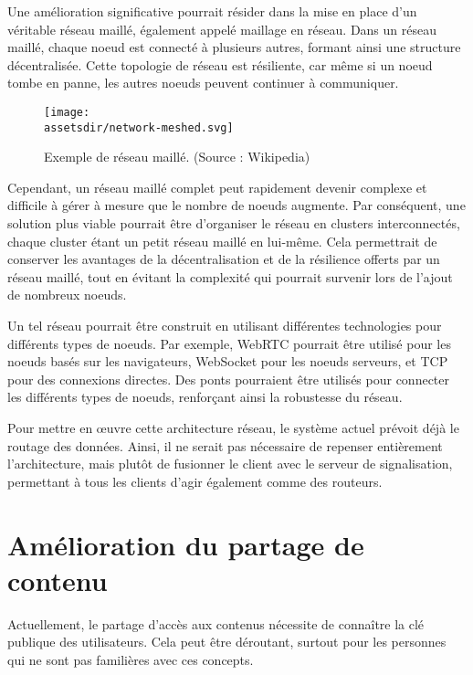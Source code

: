 Une amélioration significative pourrait résider dans la mise en place d'un véritable réseau maillé, également appelé maillage en réseau. Dans un réseau maillé, chaque noeud est connecté à plusieurs autres, formant ainsi une structure décentralisée. Cette topologie de réseau est résiliente, car même si un noeud tombe en panne, les autres noeuds peuvent continuer à communiquer.

\begin{wrapfigure}{l}{0.30\textwidth}
    \centering
    \texttt{[image: \\assetsdir/network-meshed.svg]}
    \caption{Exemple de réseau maillé. (Source : Wikipedia\cite{TopologieMesh2023})}
    \label{fig:network-meshed}
\end{wrapfigure}

Cependant, un réseau maillé complet peut rapidement devenir complexe et difficile à gérer à mesure que le nombre de noeuds augmente. Par conséquent, une solution plus viable pourrait être d'organiser le réseau en clusters interconnectés, chaque cluster étant un petit réseau maillé en lui-même. Cela permettrait de conserver les avantages de la décentralisation et de la résilience offerts par un réseau maillé, tout en évitant la complexité qui pourrait survenir lors de l'ajout de nombreux noeuds.

Un tel réseau pourrait être construit en utilisant différentes technologies pour différents types de noeuds. Par exemple, WebRTC pourrait être utilisé pour les noeuds basés sur les navigateurs, WebSocket pour les noeuds serveurs, et TCP pour des connexions directes. Des ponts pourraient être utilisés pour connecter les différents types de noeuds, renforçant ainsi la robustesse du réseau.

Pour mettre en œuvre cette architecture réseau, le système actuel prévoit déjà le routage des données. Ainsi, il ne serait pas nécessaire de repenser entièrement l'architecture, mais plutôt de fusionner le client avec le serveur de signalisation, permettant à tous les clients d'agir également comme des routeurs.

\section{Amélioration du partage de contenu}

Actuellement, le partage d'accès aux contenus nécessite de connaître la clé publique des utilisateurs. Cela peut être déroutant, surtout pour les personnes qui ne sont pas familières avec ces concepts.

